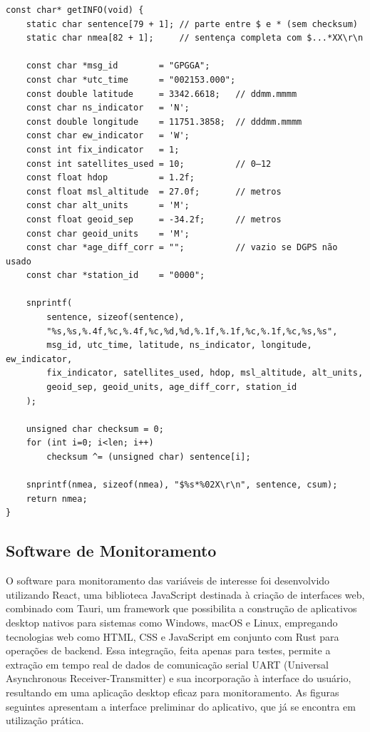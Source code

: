 \documentclass[a4paper, 12pt]{article}
\begin{document}
\begin{verbatim}
const char* getINFO(void) {
    static char sentence[79 + 1]; // parte entre $ e * (sem checksum)
    static char nmea[82 + 1];     // sentença completa com $...*XX\r\n

    const char *msg_id        = "GPGGA";
    const char *utc_time      = "002153.000";
    const double latitude     = 3342.6618;   // ddmm.mmmm
    const char ns_indicator   = 'N';
    const double longitude    = 11751.3858;  // dddmm.mmmm
    const char ew_indicator   = 'W';
    const int fix_indicator   = 1;
    const int satellites_used = 10;          // 0–12
    const float hdop          = 1.2f;
    const float msl_altitude  = 27.0f;       // metros
    const char alt_units      = 'M';
    const float geoid_sep     = -34.2f;      // metros
    const char geoid_units    = 'M';
    const char *age_diff_corr = "";          // vazio se DGPS não usado
    const char *station_id    = "0000";

    snprintf(
        sentence, sizeof(sentence),
        "%s,%s,%.4f,%c,%.4f,%c,%d,%d,%.1f,%.1f,%c,%.1f,%c,%s,%s",
        msg_id, utc_time, latitude, ns_indicator, longitude, ew_indicator,
        fix_indicator, satellites_used, hdop, msl_altitude, alt_units,
        geoid_sep, geoid_units, age_diff_corr, station_id
    );

    unsigned char checksum = 0;
    for (int i=0; i<len; i++) 
        checksum ^= (unsigned char) sentence[i];
    
    snprintf(nmea, sizeof(nmea), "$%s*%02X\r\n", sentence, csum);
    return nmea;
}
\end{verbatim}

    \newpage
    \subsection{Software de Monitoramento}
        O software para monitoramento das variáveis de interesse foi desenvolvido utilizando React, uma biblioteca JavaScript destinada à criação de interfaces web, combinado com Tauri, um framework que possibilita a construção de aplicativos desktop nativos para sistemas como Windows, macOS e Linux, empregando tecnologias web como HTML, CSS e JavaScript em conjunto com Rust para operações de backend. Essa integração, feita apenas para testes, permite a extração em tempo real de dados de comunicação serial UART (Universal Asynchronous Receiver-Transmitter) e sua incorporação à interface do usuário, resultando em uma aplicação desktop eficaz para monitoramento. As figuras seguintes apresentam a interface preliminar do aplicativo, que já se encontra em utilização prática.
\end{document}
